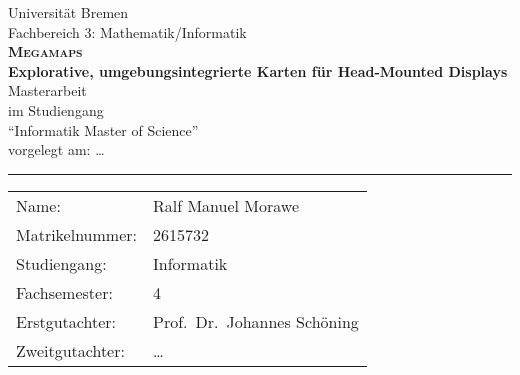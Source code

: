\begin{titlepage}
\begin{center}
    \LARGE Universität Bremen\\
    \large Fachbereich 3: Mathematik/Informatik\\
    \vspace{2cm}
    \LARGE\textsf{\textbf{\textsc{Megamaps}}}\\
    \Large\textsf{\textbf{Explorative, umgebungsintegrierte Karten für Head-Mounted Displays}} \\
    \vspace{2cm}
    \LARGE Masterarbeit\\
    \vspace{0.5cm}
    \large
    im Studiengang\\
    \enquote{Informatik Master of Science}\\
    \vspace{1cm}
    \normalsize
    vorgelegt am: \dots \\
    \vspace{3.5cm}
\end{center}
\vfill
\noindent
\hrule
\vspace{1em}
\begin{tabular}{ll}
    Name: & {Ralf Manuel Morawe} \\
    Matrikelnummer: & {2615732} \\
    Studiengang: & Informatik\\
    Fachsemester: & 4\\
    Erstgutachter: & {Prof.\ Dr.\ Johannes Schöning} \\
    Zweitgutachter: & {\dots}
\end{tabular}
\end{titlepage}
\cleardoublepage
